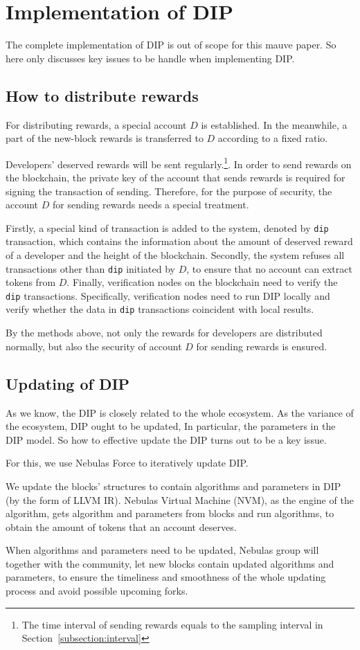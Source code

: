 \section{Implementation of DIP}
\noindent
The complete implementation of DIP is out of scope for this mauve paper. So here only discusses key issues to be handle when implementing DIP\@.

\subsection{How to distribute rewards}
\noindent
For distributing rewards, a special account $D$ is established. In the meanwhile, a part of the new-block rewards is transferred to $D$ according to a fixed ratio.

Developers' deserved rewards will be sent regularly.\footnote{The time interval of sending rewards equals to the sampling interval in Section~\ref{subsection:interval}}. In order to send rewards on the blockchain, the private key of the account that sends rewards is required for signing the transaction of sending. Therefore, for the purpose of security, the account $D$ for sending rewards needs a special treatment.

Firstly, a special kind of transaction is added to the system, denoted by \texttt{dip} transaction, which contains the information about the amount of deserved reward of a developer and the height of the blockchain. Secondly, the system refuses all transactions other than \texttt{dip} initiated by $D$, to ensure that no account can extract tokens from $D$. Finally, verification nodes on the blockchain  need to verify the \texttt{dip} transactions. Specifically, verification nodes need to run DIP locally and verify whether the data in \texttt{dip} transactions coincident with local results.

By the methods above, not only the rewards for developers are distributed normally, but also the security of account $D$ for sending rewards is ensured.

\subsection{Updating of DIP}
\noindent
As we know, the DIP is closely related to the whole ecosystem. As the variance of the ecosystem, DIP ought to be updated, In particular, the parameters in the DIP model. So how to effective update the DIP turns out to be a key issue.

For this, we use Nebulas Force to iteratively update DIP\@.

We update the blocks' structures to contain algorithms and parameters in DIP (by the form of LLVM IR). Nebulas Virtual Machine (NVM), as the engine of the algorithm, gets algorithm and parameters from blocks and run algorithms, to obtain the amount of tokens that an account deserves.

When algorithms and parameters need to be updated, Nebulas group will together with the community, let new blocks contain updated algorithms and parameters, to ensure the timeliness and smoothness of the whole updating process and avoid possible upcoming forks.
